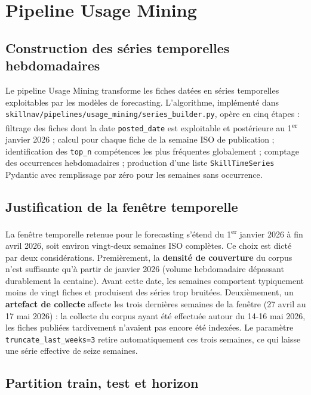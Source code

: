 \documentclass[11pt,a4paper,openany]{report}
\begin{document}
\section{Pipeline Usage Mining}

\subsection{Construction des s\'eries temporelles hebdomadaires}

Le pipeline Usage Mining transforme les fiches dat\'ees en s\'eries temporelles exploitables par les mod\`eles de forecasting. L'algorithme, impl\'ement\'e dans \texttt{skillnav/pipelines/usage\_mining/series\_builder.py}, op\`ere en cinq \'etapes : filtrage des fiches dont la date \texttt{posted\_date} est exploitable et post\'erieure au 1\textsuperscript{er} janvier 2026 ; calcul pour chaque fiche de la semaine ISO de publication ; identification des \texttt{top\_n} comp\'etences les plus fr\'equentes globalement ; comptage des occurrences hebdomadaires ; production d'une liste \texttt{SkillTimeSeries} Pydantic avec remplissage par z\'ero pour les semaines sans occurrence.

\subsection{Justification de la fen\^etre temporelle}

La fen\^etre temporelle retenue pour le forecasting s'\'etend du 1\textsuperscript{er} janvier 2026 \`a fin avril 2026, soit environ vingt-deux semaines ISO compl\`etes. Ce choix est dict\'e par deux consid\'erations. Premi\`erement, la \textbf{densit\'e de couverture} du corpus n'est suffisante qu'\`a partir de janvier 2026 (volume hebdomadaire d\'epassant durablement la centaine). Avant cette date, les semaines comportent typiquement moins de vingt fiches et produisent des s\'eries trop bruit\'ees. Deuxi\`emement, un \textbf{artefact de collecte} affecte les trois derni\`eres semaines de la fen\^etre (27 avril au 17 mai 2026) : la collecte du corpus ayant \'et\'e effectu\'ee autour du 14-16 mai 2026, les fiches publi\'ees tardivement n'avaient pas encore \'et\'e index\'ees. Le param\`etre \texttt{truncate\_last\_weeks=3} retire automatiquement ces trois semaines, ce qui laisse une s\'erie effective de seize semaines.

\subsection{Partition train, test et horizon}
\end{document}
